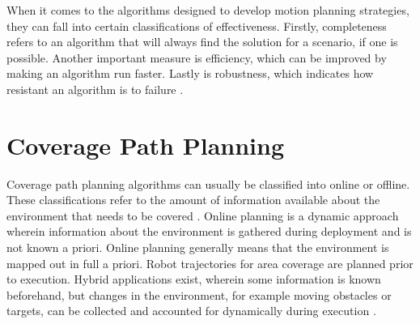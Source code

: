 
When it comes to the algorithms designed to develop motion planning strategies, they can fall into certain classifications of effectiveness. Firstly, completeness refers to an algorithm that will always find the solution for a scenario, if one is possible\cite{Lavalle2006}. Another important measure is efficiency, which can be improved by making an algorithm run faster. Lastly is robustness, which indicates how resistant an algorithm is to failure \cite{Hazon2005}. 

\section{Coverage Path Planning}
Coverage path planning algorithms can usually be classified into online or offline. These classifications refer to the amount of information available about the environment that needs to be covered \cite{CPP-Survey-2019}. Online planning is a dynamic approach wherein information about the environment is gathered during deployment and is not known a priori. Online planning generally means that the environment is mapped out in full a priori. Robot trajectories for area coverage are planned prior to execution. Hybrid applications exist, wherein some information is known beforehand, but changes in the environment, for example moving obstacles or targets, can be collected and accounted for dynamically during execution \cite{Kamrani2014}.


